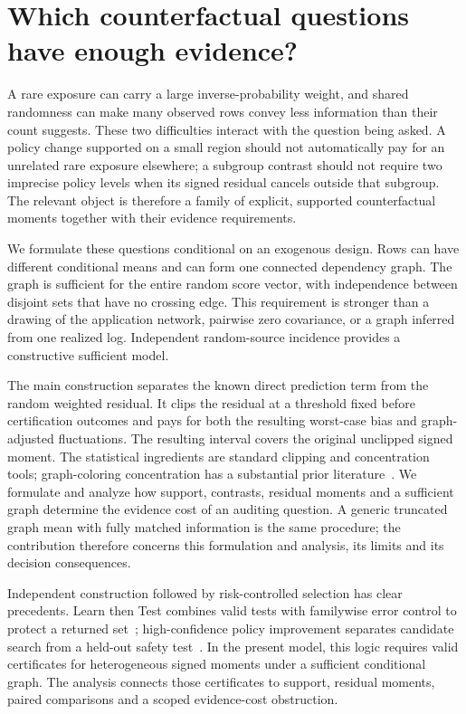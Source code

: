 \section{Which counterfactual questions have enough evidence?}

A rare exposure can carry a large inverse-probability weight, and shared
randomness can make many observed rows convey less information than their count
suggests. These two difficulties interact with the question being asked.
A policy change supported on a small region should not automatically pay for
an unrelated rare exposure elsewhere; a subgroup contrast should not require
two imprecise policy levels when its signed residual cancels outside that
subgroup. The relevant object is therefore a family of explicit, supported
counterfactual moments together with their evidence requirements.

We formulate these questions conditional on an exogenous design. Rows can
have different conditional means and can form one connected dependency graph.
The graph is sufficient for the entire random score vector, with independence
between disjoint sets that have no crossing edge. This requirement is stronger
than a drawing of the application network, pairwise zero covariance, or a graph
inferred from one realized log. Independent random-source incidence provides
a constructive sufficient model.

The main construction separates the known direct prediction term from the
random weighted residual. It clips the residual at a threshold fixed before
certification outcomes and pays for both the resulting worst-case bias and
graph-adjusted fluctuations. The resulting interval covers the original
unclipped signed moment. The statistical ingredients are standard clipping
and concentration tools; graph-coloring concentration has a substantial prior
literature~\cite{janson2004}. We formulate and analyze how support, contrasts,
residual moments and a sufficient graph determine the evidence cost of an
auditing question. A generic truncated graph mean with fully matched
information is the same procedure; the contribution therefore concerns this
formulation and analysis, its limits and its decision consequences.

Independent construction followed by risk-controlled selection has clear
precedents. Learn then Test combines valid tests with familywise error control
to protect a returned set~\cite{angelopoulos2025ltt}; high-confidence policy
improvement separates candidate search from a held-out safety
test~\cite{thomas2015hcpi}. In the present model, this logic requires valid
certificates for heterogeneous signed moments under a sufficient conditional
graph. The analysis connects those certificates to support, residual moments,
paired comparisons and a scoped evidence-cost obstruction.

